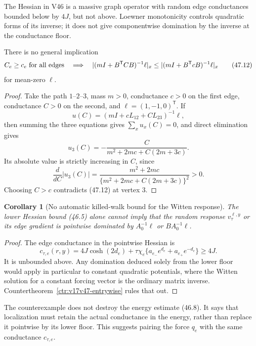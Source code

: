 \documentclass[11pt]{article}
\newtheorem{corollary}[theorem]{Corollary}
\theoremstyle{remark}
\begin{document}
The Hessian in V46 is a massive graph operator with random edge
conductances bounded below by \(4J\), but not above.  Loewner
monotonicity controls quadratic forms of its inverse; it does not give
componentwise domination by the inverse at the conductance floor.

\begin{countertheorem}
\label{ctr:v17v47-entrywise}
There is no general implication
\[
 C_e\geq c_e\ \hbox{for all edges}
 \quad\Longrightarrow\quad
 |(mI+B^{\mathsf T}CB)^{-1}\ell|_x
 \leq
 |(mI+B^{\mathsf T}cB)^{-1}\ell|_x               \tag{47.12}
\]
for mean-zero \(\ell\).
\end{countertheorem}

\begin{proof}
Take the path \(1\)--\(2\)--\(3\), mass \(m>0\), conductance \(c>0\)
on the first edge, conductance \(C>0\) on the second, and
\(\ell=(1,-1,0)^{\mathsf T}\).  If
\[
 u(C)=(mI+cL_{12}+CL_{23})^{-1}\ell,              \tag{47.13}
\]
then summing the three equations gives \(\sum_xu_x(C)=0\), and direct
elimination gives
\[
 u_3(C)=
 -\frac{C}
 {m^2+2mc+C(2m+3c)}.                              \tag{47.14}
\]
Its absolute value is strictly increasing in \(C\), since
\[
 \frac{d}{dC}|u_3(C)|
 =
 \frac{m^2+2mc}
 {\{m^2+2mc+C(2m+3c)\}^2}>0.                     \tag{47.15}
\]
Choosing \(C>c\) contradicts (47.12) at vertex \(3\).
\end{proof}

\begin{corollary}[No automatic killed-walk bound for the Witten
response]
\label{cor:v17v47-no-transfer}
The lower Hessian bound (46.5) alone cannot imply that the random
response \(v_\tau^{\ell,y}\) or its edge gradient is pointwise
dominated by \(A_0^{-1}\ell\) or \(BA_0^{-1}\ell\).
\end{corollary}

\begin{proof}
The edge conductance in the pointwise Hessian is
\[
 c_{\tau,e}(r,y)
 =
 4J\cosh(2d_e)
 +\tau\chi_e\{a_{e_-}e^{d_e}+a_{e_+}e^{-d_e}\}
 \geq4J.                                         \tag{47.16}
\]
It is unbounded above.  Any domination deduced solely from the lower
floor would apply in particular to constant quadratic potentials,
where the Witten solution for a constant forcing vector is the
ordinary matrix inverse.  Countertheorem~\ref{ctr:v17v47-entrywise}
rules that out.
\end{proof}

The counterexample does not destroy the energy estimate (46.8).
It says that localization must retain the actual conductance in the
energy, rather than replace it pointwise by its lower floor.  This
suggests pairing the force \(q_e\) with the same conductance
\(c_{\tau,e}\).
\end{document}

